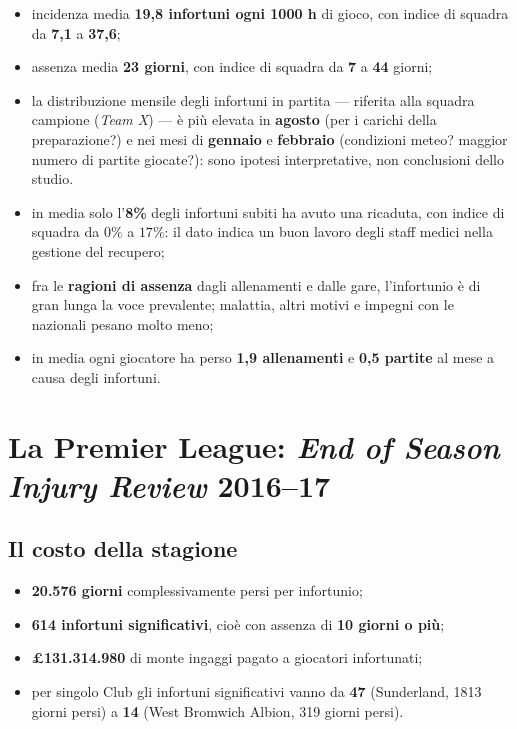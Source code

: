 \begin{itemize}
  \item incidenza media \textbf{19,8 infortuni ogni 1000 h} di gioco, con indice di squadra da
    \textbf{7,1} a \textbf{37,6};
  \item assenza media \textbf{23 giorni}, con indice di squadra da \textbf{7} a \textbf{44} giorni;
  \item la distribuzione mensile degli infortuni in partita --- riferita alla squadra campione
    (\textit{Team X}) --- è più elevata in \textbf{agosto} (per i carichi della preparazione?) e nei
    mesi di \textbf{gennaio} e \textbf{febbraio} (condizioni meteo? maggior numero di partite
    giocate?): sono ipotesi interpretative, non conclusioni dello studio.
\end{itemize}

\begin{itemize}
  \item in media solo l'\textbf{8\%} degli infortuni subiti ha avuto una ricaduta, con indice di
    squadra da $0\%$ a $17\%$: il dato indica un buon lavoro degli staff medici nella gestione del
    recupero;
  \item fra le \textbf{ragioni di assenza} dagli allenamenti e dalle gare, l'infortunio è di gran
    lunga la voce prevalente; malattia, altri motivi e impegni con le nazionali pesano molto meno;
  \item in media ogni giocatore ha perso \textbf{1,9 allenamenti} e \textbf{0,5 partite} al mese a
    causa degli infortuni.
\end{itemize}

\section{La Premier League: \textit{End of Season Injury Review} 2016--17}

\subsection{Il costo della stagione}

\begin{itemize}
  \item \textbf{20.576 giorni} complessivamente persi per infortunio;
  \item \textbf{614 infortuni significativi}, cioè con assenza di \textbf{10 giorni o più};
  \item \textbf{£131.314.980} di monte ingaggi pagato a giocatori infortunati;
  \item per singolo Club gli infortuni significativi vanno da \textbf{47} (Sunderland, 1813 giorni
    persi) a \textbf{14} (West Bromwich Albion, 319 giorni persi).
\end{itemize}

